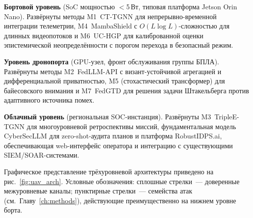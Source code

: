 \noindent\textbf{Бортовой уровень} (SoC мощностью $<$5\,Вт, типовая
платформа Jetson Orin Nano). Развёрнуты методы \textsf{M1~CT-TGNN}
для непрерывно-временной интеграции телеметрии, \textsf{M4~MambaShield}
с $O(L\log L)$-сложностью для длинных видеопотоков и
\textsf{M6~UC-HGP} для калиброванной оценки эпистемической
неопределённости с порогом перехода в безопасный режим.

\noindent\textbf{Уровень дронопорта} (GPU-узел, фронт обслуживания
группы БПЛА). Развёрнуты методы \textsf{M2~FedLLM-API} с
визант-устойчивой агрегацией и дифференциальной приватностью,
\textsf{M5} (стохастический трансформер) для байесовского внимания и
\textsf{M7~FedGTD} для решения задачи Штакельберга против адаптивного
источника помех.

\noindent\textbf{Облачный уровень} (региональная SOC-инстанция).
Развёрнуты \textsf{M3~TripleE-TGNN} для многоуровневой ретроспективы
миссий, фундаментальная модель \textsf{CyberSecLLM} для zero-shot-аудита
планов и платформа \textsf{RobustIDPS.ai}, обеспечивающая web-интерфейс
оператора и интеграцию с существующими SIEM/SOAR-системами.

Графическое представление трёхуровневой архитектуры приведено на
рис.~\ref{fig:uav_arch}. Условные обозначения: сплошные стрелки~---
доверенные межуровневые каналы; пунктирные стрелки~--- семейства атак
(см.\ Главу~\ref{ch:methods}), действующие преимущественно на нижнем
уровне борта.

